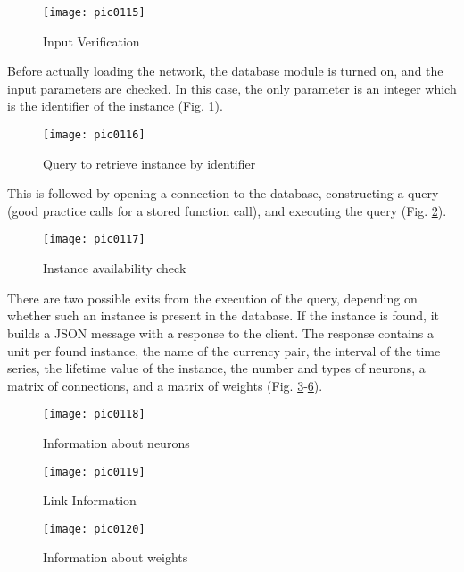 \begin{figure}[h]
\centering
\texttt{[image: pic0115]}
\caption{Input Verification}
\label{fig:pic0115}
\end{figure}
\FloatBarrier

Before actually loading the network, the database module is turned on, and the input parameters are checked. In this case, the only parameter is an integer which is the identifier of the instance (Fig. \ref{fig:pic0115}).

\begin{figure}[h]
\centering
\texttt{[image: pic0116]}
\caption{Query to retrieve instance by identifier}
\label{fig:pic0116}
\end{figure}
\FloatBarrier

This is followed by opening a connection to the database, constructing a query (good practice calls for a stored function call), and executing the query (Fig. \ref{fig:pic0116}).

\begin{figure}[h]
\centering
\texttt{[image: pic0117]}
\caption{Instance availability check}
\label{fig:pic0117}
\end{figure}
\FloatBarrier

There are two possible exits from the execution of the query, depending on whether such an instance is present in the database. If the instance is found, it builds a JSON message with a response to the client. The response contains a unit per found instance, the name of the currency pair, the interval of the time series, the lifetime value of the instance, the number and types of neurons, a matrix of connections, and a matrix of weights (Fig. \ref{fig:pic0117}-\ref{fig:pic0120}).

\begin{figure}[h]
\centering
\texttt{[image: pic0118]}
\caption{Information about neurons}
\label{fig:pic0118}
\end{figure}
\FloatBarrier

\begin{figure}[h]
\centering
\texttt{[image: pic0119]}
\caption{Link Information}
\label{fig:pic0119}
\end{figure}
\FloatBarrier

\begin{figure}[h]
\centering
\texttt{[image: pic0120]}
\caption{Information about weights}
\label{fig:pic0120}
\end{figure}
\FloatBarrier

